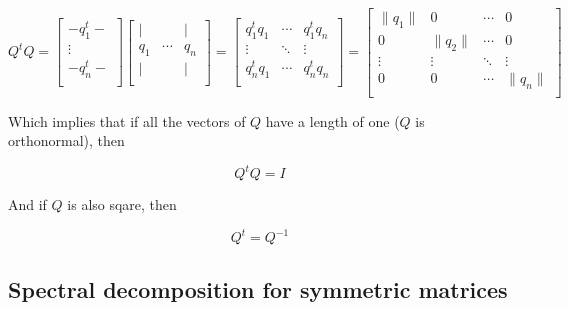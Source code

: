 \documentclass{article}
\begin{document}
    \[
        Q^t Q =
        \begin{bmatrix}
             - q_1^t - \\
               \vdots  \\
             - q_n^t - \\
        \end{bmatrix}
        \begin{bmatrix}
             |  &        &  | \\
            q_1 & \cdots & q_n\\
             |  &        &  | \\
        \end{bmatrix}
        =
        \begin{bmatrix}
            q_1^t q_1 & \cdots & q_1^t q_n \\
              \vdots  & \ddots &  \vdots   \\
            q_n^t q_1 & \cdots & q_n^t q_n \\
        \end{bmatrix}
        =
        \begin{bmatrix}
          \lVert q_1 \rVert &         0         & \cdots &         0    \\
                  0         & \lVert q_2 \rVert & \cdots &         0    \\
               \vdots       &       \vdots      & \ddots &       \vdots \\
                  0         &         0         & \cdots & \lVert q_n \rVert \\
        \end{bmatrix}
    \]

    Which implies that if all the vectors of $Q$ have a length of one ($Q$ is
    orthonormal), then

    \begin{equation*}
        Q^t Q = I
    \end{equation*}

    And if $Q$ is also sqare, then

    \begin{equation*}
        Q^t = Q^{-1}
    \end{equation*}

    \subsection{Spectral decomposition for symmetric matrices} \label{spectral_decomp}
\end{document}
